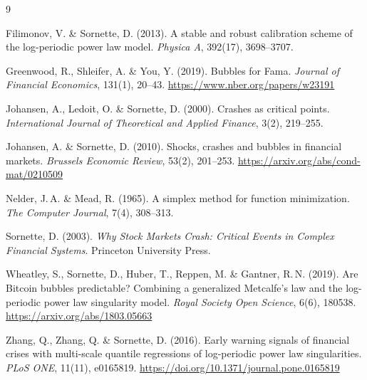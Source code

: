 \documentclass[10pt,a4paper]{article}
\begin{document}
\begin{thebibliography}{9}
\footnotesize
\setlength{\itemsep}{0pt}

Filimonov, V. \& Sornette, D. (2013). A stable and robust calibration scheme of the log-periodic
power law model. \emph{Physica A}, 392(17), 3698--3707.

Greenwood, R., Shleifer, A. \& You, Y. (2019). Bubbles for Fama. \emph{Journal of Financial
Economics}, 131(1), 20--43. \url{https://www.nber.org/papers/w23191}

Johansen, A., Ledoit, O. \& Sornette, D. (2000). Crashes as critical points.
\emph{International Journal of Theoretical and Applied Finance}, 3(2), 219--255.

Johansen, A. \& Sornette, D. (2010). Shocks, crashes and bubbles in financial markets.
\emph{Brussels Economic Review}, 53(2), 201--253. \url{https://arxiv.org/abs/cond-mat/0210509}

Nelder, J.\,A. \& Mead, R. (1965). A simplex method for function minimization.
\emph{The Computer Journal}, 7(4), 308--313.

Sornette, D. (2003). \emph{Why Stock Markets Crash: Critical Events in Complex Financial
Systems}. Princeton University Press.

Wheatley, S., Sornette, D., Huber, T., Reppen, M. \& Gantner, R.\,N. (2019). Are Bitcoin bubbles
predictable? Combining a generalized Metcalfe's law and the log-periodic power law singularity
model. \emph{Royal Society Open Science}, 6(6), 180538. \url{https://arxiv.org/abs/1803.05663}

Zhang, Q., Zhang, Q. \& Sornette, D. (2016). Early warning signals of financial crises with
multi-scale quantile regressions of log-periodic power law singularities. \emph{PLoS ONE},
11(11), e0165819. \url{https://doi.org/10.1371/journal.pone.0165819}

\end{thebibliography}
\end{document}
